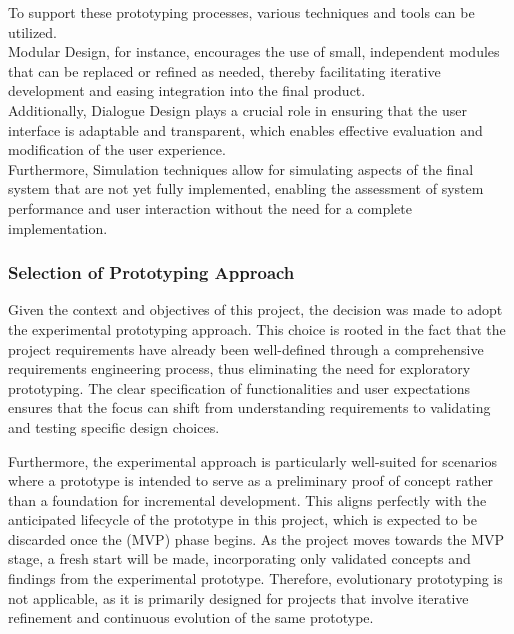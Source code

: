 To support these prototyping processes, various techniques and tools can be utilized.
\autocite[cf.][p.12]{floydSystematicLookPrototyping1984} \\Modular Design, for instance, encourages the use of small,
independent modules that can be replaced or refined as needed, thereby facilitating iterative development and easing
integration into the final product.\autocite[cf.][p.12]{floydSystematicLookPrototyping1984} \\Additionally, Dialogue
Design plays a crucial role in ensuring that the user interface is adaptable and transparent, which enables effective
evaluation and modification of the user experience.\autocite[cf.][p.12]{floydSystematicLookPrototyping1984}
\\Furthermore, Simulation techniques allow for simulating aspects of the final system that are not yet fully
implemented, enabling the assessment of system performance and user interaction without the need for a complete
implementation.\autocite[cf.][p.13]{floydSystematicLookPrototyping1984}

\subsubsection{Selection of Prototyping Approach}\label{subsubsec:ptselection}

Given the context and objectives of this project, the decision was made to adopt the experimental prototyping approach.
This choice is rooted in the fact that the project requirements have already been well-defined through a comprehensive
requirements engineering process, thus eliminating the need for exploratory prototyping. The clear specification of
functionalities and user expectations ensures that the focus can shift from understanding requirements to validating and
testing specific design choices.

Furthermore, the experimental approach is particularly well-suited for scenarios where a prototype is intended to serve
as a preliminary proof of concept rather than a foundation for incremental development. This aligns perfectly with the
anticipated lifecycle of the prototype in this project, which is expected to be discarded once the (\ac{MVP}) phase
begins. As the project moves towards the MVP stage, a fresh start will be made, incorporating only validated concepts
and findings from the experimental prototype. Therefore, evolutionary prototyping is not applicable, as it is primarily
designed for projects that involve iterative refinement and continuous evolution of the same prototype.

